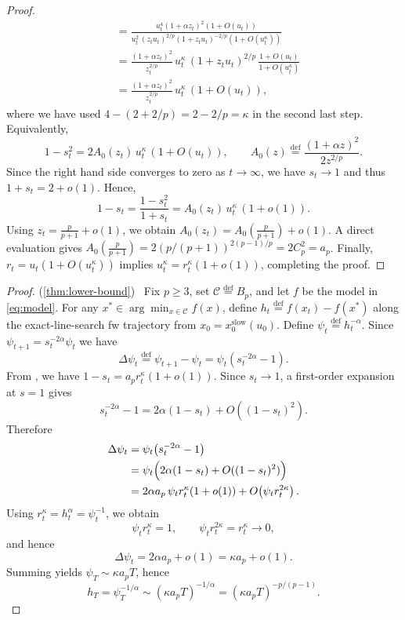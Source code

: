 \documentclass{article}
\newcommand{\defi}{\stackrel{\mathrm{\scriptscriptstyle def}}{=}}
\newcommand{\newtarget}[1]{\hypertarget{#1}{}}
\newcommand\linkofproof[1]{(\cref{#1})\newtarget{proof:#1}\ }
\begin{document}
\begin{proof}
\begin{align*}
        &= \frac{u_t^4(1+\alpha z_t)^2(1+O(u_t))}
        {u_t^2\,(z_tu_t)^{2/p}(1+z_tu_t)^{-2/p}(1+O(u_t^\kappa))} \\
        &= \frac{(1+\alpha z_t)^2}{z_t^{2/p}}\,u_t^\kappa\,
        (1+z_tu_t)^{2/p}\,\frac{1+O(u_t)}{1+O(u_t^\kappa)} \\
        &= \frac{(1+\alpha z_t)^2}{z_t^{2/p}}\,u_t^\kappa\,(1+O(u_t)),
    \end{align*}
    where we have used $4-(2+2/p)=2-2/p=\kappa$ in the second last step.
    Equivalently,
    \[
        1-s_t^2 = 2A_0(z_t)\,u_t^\kappa\,(1+O(u_t)),
        \qquad
        A_0(z)\defi \frac{(1+\alpha z)^2}{2z^{2/p}}.
    \]
    Since the right hand side converges to zero as $t\to\infty$, we have $s_t \to 1$ and thus $1+s_t=2+o(1)$.
    Hence,
    \[
        1-s_t = \frac{1-s_t^2}{1+s_t}
        = A_0(z_t)\,u_t^\kappa\,(1+o(1)).
    \]
    Using $z_t=\tfrac{p}{p+1}+o(1)$, we obtain $A_0(z_t)=A_0(\tfrac{p}{p+1})+o(1)$.
    A direct evaluation gives $A_0(\tfrac{p}{p+1})=2(p/(p+1))^{2(p-1)/p}=2C_p^2=a_p$.
    Finally, $r_t=u_t(1+O(u_t^\kappa))$ implies $u_t^\kappa=r_t^\kappa(1+o(1))$, completing the proof.
\end{proof}

\lowerBoundTheorem*
\begin{proof}\linkofproof{thm:lower-bound}
    Fix $p\ge 3$, set $\mathcal C\defi B_p$, and let $f$ be the model in \eqref{eq:model}. For any $x^*\in\arg\min_{x\in\mathcal C }f(x)$, define $h_t\defi f(x_t)-f(x^*)$ along the exact-line-search \gls{fw} trajectory from $x_0=x_0^{\mathrm{slow}}(u_0)$.
    Define $\psi_t\defi h_t^{-\alpha}$.
    Since $\psi_{t+1}=s_t^{-2\alpha}\psi_t$ we have
    \[
    \Delta\psi_t\defi \psi_{t+1}-\psi_t=\psi_t(s_t^{-2\alpha}-1).
    \]
    From , we have $1-s_t=a_pr_t^\kappa(1+o(1))$.
    Since $s_t\to1$, a first-order expansion at $s=1$ gives
    \[
      s_t^{-2\alpha}-1 = 2\alpha(1-s_t)+O((1-s_t)^2).
    \]
    Therefore
    \begin{align*}
      \Delta\psi_t
      &= \psi_t\bigl(s_t^{-2\alpha}-1\bigr) \\
      &= \psi_t\Bigl(2\alpha(1-s_t)+O((1-s_t)^2)\Bigr) \\
      &= 2\alpha a_p\,\psi_t r_t^\kappa(1+o(1))
      + O\!\left(\psi_t r_t^{2\kappa}\right).
    \end{align*}
    Using $r_t^\kappa=h_t^\alpha=\psi_t^{-1}$, we obtain
    \[
      \psi_t r_t^\kappa=1,
      \qquad
      \psi_t r_t^{2\kappa}=r_t^\kappa\to0,
    \]
    and hence
    \[
      \Delta\psi_t = 2\alpha a_p + o(1)=\kappa a_p+o(1).
    \]
    Summing yields $\psi_T\sim \kappa a_p T$, hence
    \[
        h_T=\psi_T^{-1/\alpha}\sim (\kappa a_p T)^{-1/\alpha} = (\kappa a_p T)^{-p/(p-1)}.
    \]
\end{proof}
\end{document}
